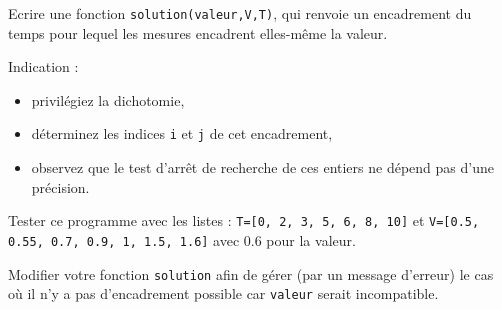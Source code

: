 \documentclass[11pt,a4paper]{article}
\renewcommand{\:}{\textbackslash}
\begin{document}
Ecrire une fonction \texttt{solution(valeur,V,T)}, qui renvoie un
encadrement du temps pour lequel les mesures encadrent elles-même la valeur.

Indication :
\begin{itemize}
\item privilégiez la dichotomie,
\item déterminez les indices \texttt{i} et \texttt{j} de cet encadrement,
\item observez que le test d'arrêt de recherche de ces entiers ne dépend pas d'une précision.
\end{itemize}

Tester ce programme avec les listes : \texttt{T=[0, 2, 3, 5, 6, 8, 10]} et \texttt{V=[0.5, 0.55, 0.7, 0.9, 1, 1.5, 1.6]} avec 0.6  pour la valeur.

Modifier votre fonction \texttt{solution} afin de gérer (par un message d'erreur) le cas où il n'y a pas d'encadrement possible car \texttt{valeur} serait incompatible.
\end{document}
